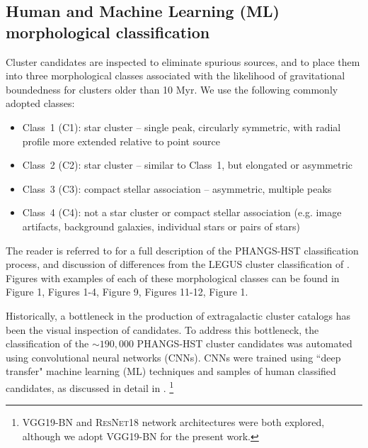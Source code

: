 \documentclass[linenumbers]{aastex63}
\begin{document}
\subsection{Human and Machine Learning (ML) morphological classification}\label{ssec:classification}
Cluster candidates are inspected to eliminate spurious sources, and to place them into three morphological classes associated
with the likelihood of gravitational boundedness for clusters older than 10 Myr\citep{whitmore_antennae_2010, gieles_distinction_2011, bastian_stellar_2012, fall_similarities_2012, chandar_star-cluster_2014, grasha_spatial_2015, adamo_legacy_2017, cook_star_2019, wei_deep_2020}.  We use the following commonly adopted classes:
\begin{itemize}
    \item Class~1 (C1): star cluster -- single peak, circularly symmetric, with radial profile more extended relative to point source
    \item Class~2 (C2): star cluster -- similar to Class~1, but elongated or asymmetric 
    \item Class~3 (C3): compact stellar association -- asymmetric, multiple peaks %
    \item Class~4 (C4): not a star cluster or compact stellar association (e.g. image artifacts, background galaxies, individual stars or pairs of stars) 
\end{itemize}
The reader is referred to \citet{whitmore_star_2021} for a full description of the PHANGS-HST classification process, and discussion of differences from the LEGUS cluster classification of \citet{adamo_legacy_2017}.  Figures with examples of each of these morphological classes can be found in \citet{wei_deep_2020} Figure 1, \citet{whitmore_star_2021} Figures 1-4, \citet{lee_phangs-hst_2022} Figure 9, \citet{deger_bright_2022} Figures 11-12, \citet{hannon_star_2023} Figure 1.

Historically, a bottleneck in the production of extragalactic cluster catalogs has been the visual inspection of candidates.
To address this bottleneck, the classification of the $\sim190,000$ PHANGS-HST cluster candidates was automated using convolutional neural networks (CNNs).  CNNs were trained using ``deep transfer" machine learning (ML) techniques and samples of human classified candidates, as discussed in detail in \cite{wei_deep_2020, whitmore_star_2021, hannon_star_2023}. \footnote{\textsc{VGG19-BN} \citep{simonyan_very_2015} and \textsc{ResNet18} \citep{he_deep_2015} network architectures were both explored, although we adopt \textsc{VGG19-BN} for the present work.}
\end{document}
